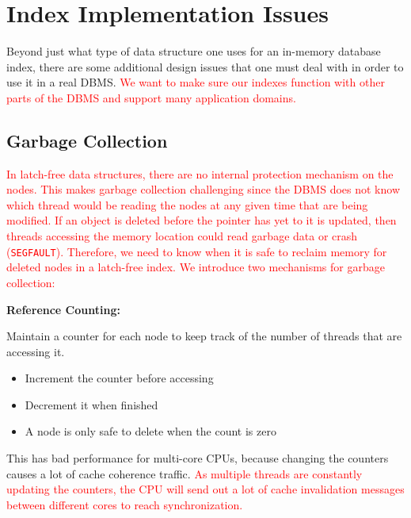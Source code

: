 \documentclass[11pt]{article}
\newcommand{\rr}[1]{\textcolor{red}{#1}}
\begin{document}
\maketitle
\thispagestyle{plain}

\section{Index Implementation Issues}
Beyond just what type of data structure one uses for an in-memory database index, there are some additional design issues that one must deal with in order to use it in a real DBMS. \rr{We want to make sure our indexes function with other parts of the DBMS and support many application domains.}

\subsection*{Garbage Collection}
\rr{In latch-free data structures, there are no internal protection mechanism on the nodes. This makes garbage collection challenging since the DBMS does not know which thread would be reading the nodes at any given time that are being modified. If an object is deleted before the pointer has yet to it is updated, then threads accessing the memory location could read garbage data or crash (\texttt{SEGFAULT}). Therefore, we need to know when it is safe to reclaim memory for deleted nodes in a latch-free index. We introduce two mechanisms for garbage collection:}

\textbf{Reference Counting:}

Maintain a counter for each node to keep track of the number of threads that are accessing it.
\begin{itemize}
    \item Increment the counter before accessing
    \item Decrement it when finished
    \item A node is only safe to delete when the count is zero
\end{itemize}
    
This has bad performance for multi-core CPUs, because changing the counters causes a lot of cache coherence traffic. \rr{As multiple threads are constantly updating the counters, the CPU will send out a lot of cache invalidation messages between different cores to reach synchronization.}
\end{document}
